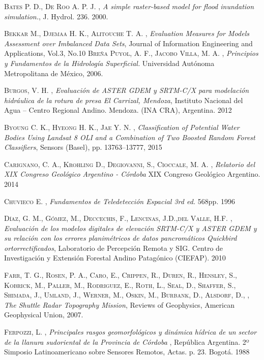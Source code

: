 \begin{thebibliography}{9}

 \textsc{Bates P. D., De Roo A. P. J. } , \textit{A simple raster-based model for flood inundation simulation.},   J. Hydrol. 236. 2000.

 \textsc{Bekkar M., Djemaa H. K., Alitouche T. A.} , \textit{Evaluation Measures for Models Assessment over Imbalanced Data Sets}, Journal of Information Engineering and Applications, Vol.3, No.10
 \textsc{Breña Puyol, A. F., Jacobo Villa, M. A.} , \textit{Principios y Fundamentos de la Hidrología Superficial.} Universidad Autónoma Metropolitana de México, 2006.

 \textsc{Burgos, V. H.} , \textit{Evaluación de ASTER GDEM y SRTM-C/X para modelación hidráulica de la rotura de presa El Carrizal, Mendoza}, Instituto Nacional del Agua – Centro Regional Andino. Mendoza. (INA CRA), Argentina. 2012

 \textsc{Byoung C. K., Hyeong H. K., Jae Y. N.} , \textit{Classification of Potential Water Bodies Using Landsat 8 OLI and a Combination of Two Boosted Random Forest Classifiers}, Sensors (Basel), pp. 13763–13777, 2015

 \textsc{Carignano, C. A., Krohling D., Degiovanni, S., Cioccale, M. A.} , \textit{Relatorio del XIX Congreso Geológico Argentino - Córdoba} XIX Congreso Geológico Argentino. 2014

 \textsc{Chuvieco E.} , \textit{Fundamentos de Teledetección Espacial 3rd ed.} 568pp. 1996

 \textsc{Díaz, G. M., Gómez, M., Deccechis, F., Lencinas, J.D.,del Valle, H.F.} , \textit{Evaluación de los modelos digitales de elevación SRTM-C/X y ASTER GDEM y su relación con los errores planimétricos de datos pancromáticos Quickbird ortorrectificados}, Laboratorio de Percepción Remota y SIG. Centro de Investigación y Extensión Forestal Andino Patagónico (CIEFAP). 2010

 \textsc{Farr, T. G., Rosen, P. A., Caro, E., Crippen, R., Duren, R., Hensley, S., Kobrick, M., Paller, M., Rodriguez, E., Roth, L., Seal, D., Shaffer, S., Shimada, J., Umland, J., Werner, M., Oskin, M., Burbank, D., Alsdorf, D.,} , \textit{The Shuttle Radar Topography Mission}, Reviews of Geophysics, American Geophysical Union, 2007.

 \textsc{Ferpozzi, L.} , \textit{Principales rasgos geomorfológicos y dinámica hídrica de un sector de la llanura sudoriental de la Provincia de Córdoba} , República Argentina. 2º Simposio Latinoamericano sobre Sensores Remotos, Actas. p. 23. Bogotá. 1988


\end{thebibliography}
